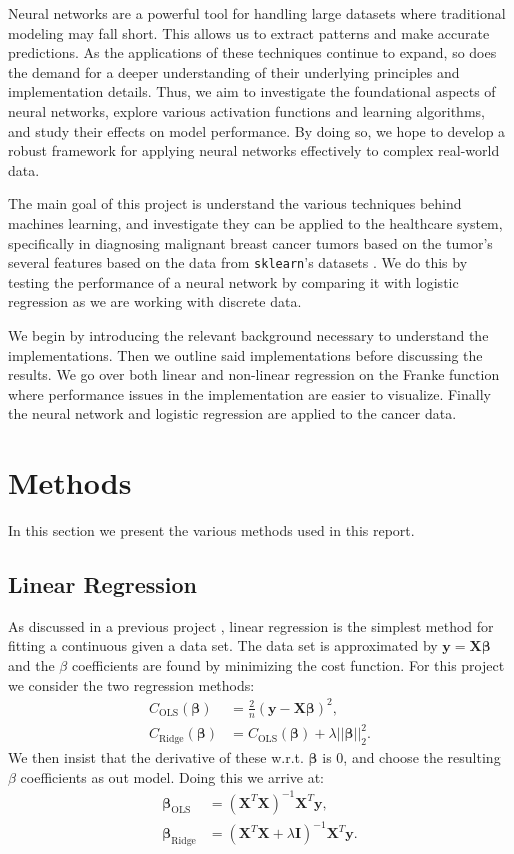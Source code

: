 \documentclass[%
reprint,s
amsmath,amssymb,
aps,
]{revtex4-2}
\begin{document}
Neural networks are a powerful tool for handling large datasets where traditional modeling may fall short. This allows us to extract patterns and make accurate predictions. As the applications of these techniques continue to expand, so does the demand for a deeper understanding of their underlying principles and implementation details. Thus, we aim to investigate the foundational aspects of neural networks, explore various activation functions and learning algorithms, and study their effects on model performance. By doing so, we hope to develop a robust framework for applying neural networks effectively to complex real-world data.

The main goal of this project is understand the various techniques behind machines learning, and investigate they can be applied to the healthcare system, specifically in diagnosing malignant breast cancer tumors based on the tumor's several features based on the data from \texttt{sklearn}'s datasets \cite{sklearn}. We do this by testing the performance of a neural network by comparing it with logistic regression as we are working with discrete data. 

We begin by introducing the relevant background necessary to understand the implementations. Then we outline said implementations before discussing the results. We go over both linear and non-linear regression on the Franke function where performance issues in the implementation are easier to visualize. Finally the neural network and logistic regression are applied to the cancer data. 

\section{Methods}
In this section we present the various methods used in this report. 

\subsection{Linear Regression}
As discussed in a previous project \cite{project1}, linear regression is the simplest method for fitting a continuous given a data set. The data set is approximated by $\bm y=\bm X\bm\beta$ and the $\beta$ coefficients are found by minimizing the cost function. For this project we consider the two regression methods:
\begin{align}
	C_\text{OLS}(\bm\beta)&=\frac{2}{n}(\bm y-\bm X\bm\beta)^2,\\
	C_\text{Ridge}(\bm\beta)&=C_\text{OLS}(\bm\beta)+\lambda||\bm\beta||_2^2.
\end{align}
We then insist that the derivative of these w.r.t. $\bm\beta$ is $0$, and choose the resulting $\beta$ coefficients as out model. Doing this we arrive at:
\begin{align}
	\bm\beta_\text{OLS}&=(\bm X^T\bm X)^{-1}\bm X^T\bm y,\\
	\bm\beta_\text{Ridge}&=(\bm X^T\bm X+\lambda \bm I)^{-1}\bm X^T\bm y.
\end{align}
\end{document}
